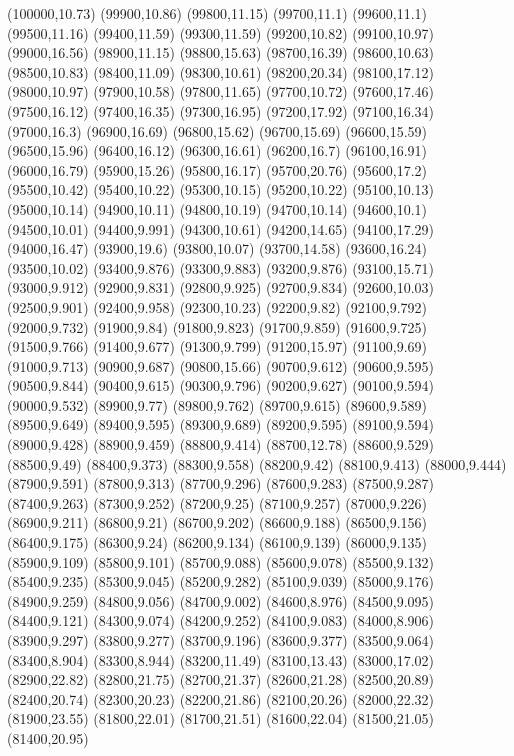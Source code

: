 (100000,10.73)
(99900,10.86)
(99800,11.15)
(99700,11.1)
(99600,11.1)
(99500,11.16)
(99400,11.59)
(99300,11.59)
(99200,10.82)
(99100,10.97)
(99000,16.56)
(98900,11.15)
(98800,15.63)
(98700,16.39)
(98600,10.63)
(98500,10.83)
(98400,11.09)
(98300,10.61)
(98200,20.34)
(98100,17.12)
(98000,10.97)
(97900,10.58)
(97800,11.65)
(97700,10.72)
(97600,17.46)
(97500,16.12)
(97400,16.35)
(97300,16.95)
(97200,17.92)
(97100,16.34)
(97000,16.3)
(96900,16.69)
(96800,15.62)
(96700,15.69)
(96600,15.59)
(96500,15.96)
(96400,16.12)
(96300,16.61)
(96200,16.7)
(96100,16.91)
(96000,16.79)
(95900,15.26)
(95800,16.17)
(95700,20.76)
(95600,17.2)
(95500,10.42)
(95400,10.22)
(95300,10.15)
(95200,10.22)
(95100,10.13)
(95000,10.14)
(94900,10.11)
(94800,10.19)
(94700,10.14)
(94600,10.1)
(94500,10.01)
(94400,9.991)
(94300,10.61)
(94200,14.65)
(94100,17.29)
(94000,16.47)
(93900,19.6)
(93800,10.07)
(93700,14.58)
(93600,16.24)
(93500,10.02)
(93400,9.876)
(93300,9.883)
(93200,9.876)
(93100,15.71)
(93000,9.912)
(92900,9.831)
(92800,9.925)
(92700,9.834)
(92600,10.03)
(92500,9.901)
(92400,9.958)
(92300,10.23)
(92200,9.82)
(92100,9.792)
(92000,9.732)
(91900,9.84)
(91800,9.823)
(91700,9.859)
(91600,9.725)
(91500,9.766)
(91400,9.677)
(91300,9.799)
(91200,15.97)
(91100,9.69)
(91000,9.713)
(90900,9.687)
(90800,15.66)
(90700,9.612)
(90600,9.595)
(90500,9.844)
(90400,9.615)
(90300,9.796)
(90200,9.627)
(90100,9.594)
(90000,9.532)
(89900,9.77)
(89800,9.762)
(89700,9.615)
(89600,9.589)
(89500,9.649)
(89400,9.595)
(89300,9.689)
(89200,9.595)
(89100,9.594)
(89000,9.428)
(88900,9.459)
(88800,9.414)
(88700,12.78)
(88600,9.529)
(88500,9.49)
(88400,9.373)
(88300,9.558)
(88200,9.42)
(88100,9.413)
(88000,9.444)
(87900,9.591)
(87800,9.313)
(87700,9.296)
(87600,9.283)
(87500,9.287)
(87400,9.263)
(87300,9.252)
(87200,9.25)
(87100,9.257)
(87000,9.226)
(86900,9.211)
(86800,9.21)
(86700,9.202)
(86600,9.188)
(86500,9.156)
(86400,9.175)
(86300,9.24)
(86200,9.134)
(86100,9.139)
(86000,9.135)
(85900,9.109)
(85800,9.101)
(85700,9.088)
(85600,9.078)
(85500,9.132)
(85400,9.235)
(85300,9.045)
(85200,9.282)
(85100,9.039)
(85000,9.176)
(84900,9.259)
(84800,9.056)
(84700,9.002)
(84600,8.976)
(84500,9.095)
(84400,9.121)
(84300,9.074)
(84200,9.252)
(84100,9.083)
(84000,8.906)
(83900,9.297)
(83800,9.277)
(83700,9.196)
(83600,9.377)
(83500,9.064)
(83400,8.904)
(83300,8.944)
(83200,11.49)
(83100,13.43)
(83000,17.02)
(82900,22.82)
(82800,21.75)
(82700,21.37)
(82600,21.28)
(82500,20.89)
(82400,20.74)
(82300,20.23)
(82200,21.86)
(82100,20.26)
(82000,22.32)
(81900,23.55)
(81800,22.01)
(81700,21.51)
(81600,22.04)
(81500,21.05)
(81400,20.95)
